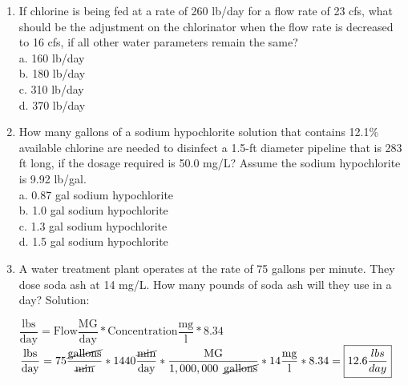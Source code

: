 \documentclass{article}
\begin{document}
\begin{enumerate}
\item If chlorine is being fed at a rate of 260 lb/day for a flow rate of 23 cfs, what should be the adjustment on the chlorinator when the flow rate is decreased to 16 cfs, if all other water parameters remain the same?\\
a.	160 lb/day\\
b.	180 lb/day\\
c.	310 lb/day\\
d.	370 lb/day\\

\item How many gallons of a sodium hypochlorite solution that contains 12.1\% available chlorine are needed to disinfect a 1.5-ft diameter pipeline that is 283 ft long, if the dosage required is 50.0 mg/L? Assume the sodium hypochlorite is 9.92 lb/gal.\\
a.	0.87 gal sodium hypochlorite\\
b.	1.0 gal sodium hypochlorite\\
c.	1.3 gal sodium hypochlorite\\
d.	1.5 gal sodium hypochlorite\\

\item A water treatment plant operates at the rate of 75 gallons per minute. They dose soda ash at 14 mg/L. How many pounds of soda ash will they use in a day?
Solution:\\
\vspace{0.2cm}
\begin{figure}[h]
\end{figure}
$\dfrac{\mathrm{lbs}}{\mathrm{day}}=\mathrm{Flow}\dfrac{{\mathrm{MG}}}{\mathrm{day}}* \mathrm{Concentration}\dfrac{\mathrm{mg}}{\mathrm{l}}*8.34$
\\
\vspace{0.2cm}
$\dfrac{\mathrm{lbs}}{\mathrm{day}}=75 \dfrac{\cancel{\mathrm{gallons}}}{\cancel{\mathrm{min}}}* 1440\dfrac{\cancel{\mathrm{min}}}{\mathrm{day}}*\dfrac{\mathrm{MG}}{1,000,000 \enspace \cancel{\mathrm{gallons}}}*14\dfrac{\mathrm{mg}}{\mathrm{l}}*8.34 = \boxed{12.6\dfrac{lbs}{day}}$
\vspace{0.2cm}


\end{enumerate}
\end{document}
